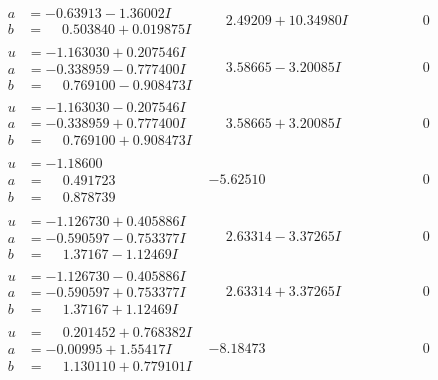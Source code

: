 \documentclass[1p]{elsarticle_modified}
\theoremstyle{definition}
\begin{document}
$$\begin{array}{c|c|c}
\begin{aligned}
a &= -0.63913 - 1.36002 I \\
b &= \phantom{-}0.503840 + 0.019875 I\end{aligned}
 & \phantom{-}2.49209 + 10.34980 I & \phantom{-0.000000 } 0 \\ \hline\begin{aligned}
u &= -1.163030 + 0.207546 I \\
a &= -0.338959 - 0.777400 I \\
b &= \phantom{-}0.769100 - 0.908473 I\end{aligned}
 & \phantom{-}3.58665 - 3.20085 I & \phantom{-0.000000 } 0 \\ \hline\begin{aligned}
u &= -1.163030 - 0.207546 I \\
a &= -0.338959 + 0.777400 I \\
b &= \phantom{-}0.769100 + 0.908473 I\end{aligned}
 & \phantom{-}3.58665 + 3.20085 I & \phantom{-0.000000 } 0 \\ \hline\begin{aligned}
u &= -1.18600\phantom{ +0.000000I} \\
a &= \phantom{-}0.491723\phantom{ +0.000000I} \\
b &= \phantom{-}0.878739\phantom{ +0.000000I}\end{aligned}
 & -5.62510\phantom{ +0.000000I} & \phantom{-0.000000 } 0 \\ \hline\begin{aligned}
u &= -1.126730 + 0.405886 I \\
a &= -0.590597 - 0.753377 I \\
b &= \phantom{-}1.37167 - 1.12469 I\end{aligned}
 & \phantom{-}2.63314 - 3.37265 I & \phantom{-0.000000 } 0 \\ \hline\begin{aligned}
u &= -1.126730 - 0.405886 I \\
a &= -0.590597 + 0.753377 I \\
b &= \phantom{-}1.37167 + 1.12469 I\end{aligned}
 & \phantom{-}2.63314 + 3.37265 I & \phantom{-0.000000 } 0 \\ \hline\begin{aligned}
u &= \phantom{-}0.201452 + 0.768382 I \\
a &= -0.00995 + 1.55417 I \\
b &= \phantom{-}1.130110 + 0.779101 I\end{aligned}
 & -8.18473\phantom{ +0.000000I} & \phantom{-0.000000 } 0 \\ \hline\begin{aligned}

\end{aligned}
\end{array}$$
\end{document}
